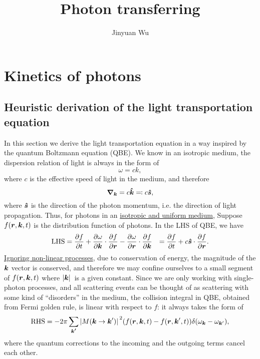 \documentclass[hyperref, a4paper]{article}
\title{Photon transferring}
\author{Jinyuan Wu}
\def\\{}%
\begin{document}
\maketitle

\section{Kinetics of photons}

\subsection{Heuristic derivation of the light transportation equation}

In this section we derive the light transportation equation 
in a way inspired by the quantum Boltzmann equation (QBE).
We know in an isotropic medium, the dispersion relation of light is always 
in the form of 
\begin{equation}
    \omega = c k,  
\end{equation}
where $c$ is the effective speed of light in the medium, 
and therefore 
\begin{equation}
    \grad_{\vb*{k}} = c \vu*{k} \eqqcolon c \vu*{s},
\end{equation}
where $\vu*{s}$ is the direction of the photon momentum, 
i.e. the direction of light propagation.
Thus, for photons in an \ul{isotropic and uniform medium}, 
Suppose $f(\vb*{r}, \vb*{k}, t)$ is the distribution function of photons.
In the LHS of QBE, we have 
\begin{equation}
    \begin{aligned}
        \text{LHS} &= \pdv{f}{t} + \pdv{\omega}{\vb*{k}} \cdot \pdv{f}{\vb*{r}}
        - \pdv{\omega}{\vb*{r}} \cdot \pdv{f}{\vb*{k}} \\
        &= \pdv{f}{t} + c \vu*{s} \cdot \pdv{f}{\vb*{r}}.
    \end{aligned}
\end{equation}
\ul{Ignoring non-linear processes}, due to conservation of energy, 
the magnitude of the $\vb*{k}$ vector is conserved, 
and therefore we may confine ourselves to 
a small segment of $f(\vb*{r}, \vb*{k}, t)$
where $\abs*{\vb*{k}}$ is a given constant.
Since we are only working with single-photon processes, 
and all scattering events can be thought of as 
scattering with some kind of ``disorders'' in the medium, 
the collision integral in QBE, obtained from Fermi golden rule, 
is linear with respect to $f$: 
it always takes the form of 
\begin{equation}
    \text{RHS} = - 2\pi \sum_{\vb*{k'}} \abs*{M(\vb*{k} \to \vb*{k}')}^2 (f(\vb*{r}, \vb*{k} , t) - f(\vb*{r}, \vb*{k}', t) )
    \delta(\omega_{\vb*{k}} - \omega_{\vb*{k}'}),
\end{equation}
where the quantum corrections to the incoming and the outgoing terms 
cancel each other. 
\end{document}
